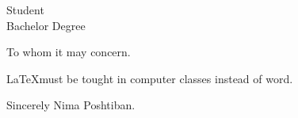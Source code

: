 \documentclass[12pt]{letter} %
\begin{document}
\begin{letter}{Student \\ Bachelor Degree} %
\opening{To whom it may concern.} %

\LaTeX must be tought in computer classes instead of word.
\blindtext
\closing{Sincerely Nima Poshtiban.} %
\end{letter}
	
\end{document}
